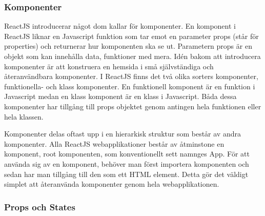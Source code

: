 
\subsubsection{Komponenter}
ReactJS introducerar något dom kallar för komponenter. En komponent i ReactJS liknar en Javascript funktion som tar emot en parameter props (står för properties) och returnerar hur komponenten ska se ut. Parametern props är en objekt som kan innehålla data, funktioner med mera. Idén bakom att introducera komponenter är att konstruera en hemsida i små självständiga och återanvändbara komponenter. I ReactJS finns det två olika sorters komponenter, funktionella- och klass komponenter. En funktionell komponent är en funktion i Javascript medan en klass komponent är en klass i Javascript. Båda dessa komponenter har tillgång till props objektet genom antingen hela funktionen eller hela klassen. 

Komponenter delas oftast upp i en hierarkisk struktur som består av andra komponenter. Alla ReactJS webapplikationer består av åtminstone en komponent, root komponenten, som konventionellt sett namnges App. För att använda sig av en komponent, behöver man först importera komponenten och sedan har man tillgång till den som ett HTML element. Detta gör det väldigt simplet att återanvända komponenter genom hela webapplikationen.

\subsubsection{Props och States} 



